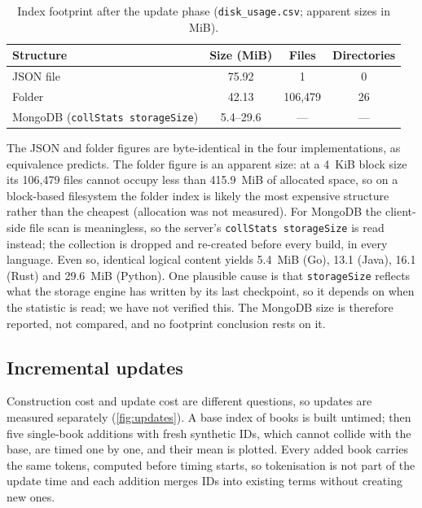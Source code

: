 \begin{table}[htbp]
    \centering
    \caption{Index footprint after the update phase (\texttt{disk\_usage.csv};
    apparent sizes in MiB).}
    \label{tab:index-footprint}
    \begin{tabular}{@{}lccc@{}}
        \toprule
        Structure & Size (MiB) & Files & Directories \\
        \midrule
        JSON file & 75.92 & 1 & 0 \\
        Folder & 42.13 & 106{,}479 & 26 \\
        MongoDB (\texttt{collStats storageSize}) & 5.4--29.6 & --- & --- \\
        \bottomrule
    \end{tabular}
\end{table}

The JSON and folder figures are byte-identical in the four implementations,
as equivalence predicts. The folder figure is an apparent size: at a 4~KiB
block size its 106{,}479 files cannot occupy less than 415.9~MiB of allocated
space, so on a block-based filesystem the folder index is likely the most
expensive structure rather than the cheapest (allocation was not measured).
For MongoDB the client-side file scan is meaningless, so the server's
\texttt{collStats storageSize} is read instead; the collection is dropped and
re-created before every build, in every language. Even so, identical logical
content yields 5.4~MiB (Go), 13.1 (Java), 16.1 (Rust) and 29.6~MiB (Python).
One plausible cause is that \texttt{storageSize} reflects what the storage
engine has written by its last checkpoint, so it depends on when the
statistic is read; we have not verified this. The MongoDB size is therefore
reported, not compared, and no footprint conclusion rests on it.

\subsection{Incremental updates}
\label{sec:index-updates}

Construction cost and update cost are different questions, so updates are
measured separately (\cref{fig:updates}). A base index of  books is built untimed; then five single-book additions with
fresh synthetic IDs, which cannot collide with the base, are timed one by
one, and their mean is plotted. Every added book carries the same tokens,
computed before timing starts, so tokenisation is not part of the update
time and each addition merges IDs into existing terms without creating new
ones.

